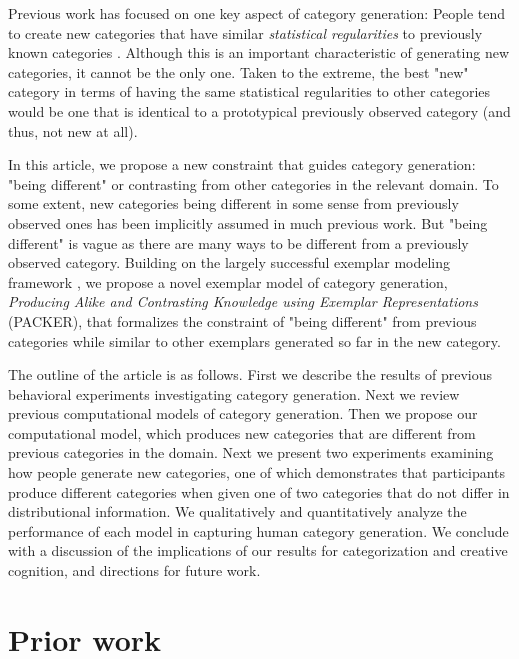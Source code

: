 \documentclass[12pt]{article}
\begin{document}
\begin{flushleft}
Previous work has focused on one key aspect of category generation: People tend to create new categories that have similar {\em statistical regularities} to previously known categories \citep{jern2013probabilistic,ward1994structured}. Although this is an important characteristic of generating new categories, it cannot be the only one. Taken to the extreme, the best "new" category in terms of having the same statistical regularities to other categories would be one that is identical to a prototypical previously observed category (and thus, not new at all). 

In this article, we propose a new constraint that guides category generation: "being different" or contrasting from other categories in the relevant domain. To some extent, new categories being different in some sense from previously observed ones has been implicitly assumed in much previous work. But "being different" is vague as there are many ways to be different from a previously observed category. Building on the largely successful exemplar modeling framework \citep{medin1978context,nosofsky1984choice}, we propose a novel exemplar model of category generation, {\em Producing Alike and Contrasting Knowledge using Exemplar Representations} (PACKER), that formalizes the constraint of "being different" from previous categories while similar to other exemplars generated so far in the new category.

The outline of the article is as follows. First we describe the results of previous behavioral experiments investigating category generation. Next we review previous computational models of category generation. Then we propose our computational model, which produces new categories that are different from previous categories in the domain. Next we present two experiments examining how people generate new categories, one of which demonstrates that participants produce different categories when given one of two categories that do not differ in distributional information. We qualitatively and quantitatively analyze the performance of each model in capturing human category generation. We conclude with a discussion of the implications of our results for categorization and creative cognition, and directions for future work.

\section{Prior work}


\end{flushleft}
\end{document}
